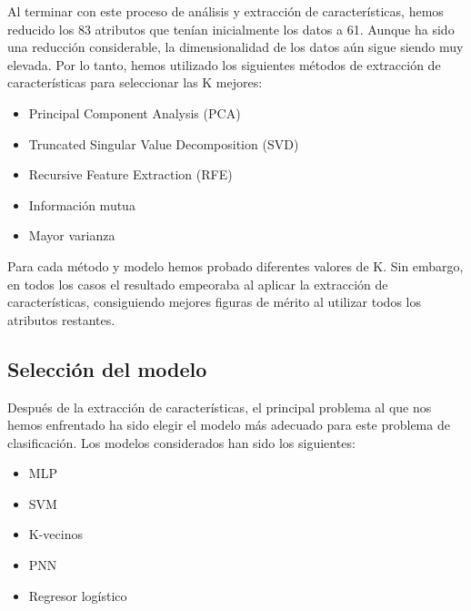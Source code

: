\documentclass[journal,twoside]{JoPhA}
\begin{document}
Al terminar con este proceso de análisis y extracción de características, hemos reducido los 83 atributos que tenían inicialmente los datos a 61. Aunque ha sido una reducción considerable, la dimensionalidad de los datos aún sigue siendo muy elevada. Por lo tanto, hemos utilizado los siguientes métodos de extracción de características para seleccionar las K mejores: \\

\begin{itemize}
	\item Principal Component Analysis (PCA)
	\item Truncated Singular Value Decomposition (SVD)
	\item Recursive Feature Extraction (RFE)
	\item Información mutua
	\item Mayor varianza \\
\end{itemize}

Para cada método y modelo hemos probado diferentes valores de K. Sin embargo, en todos los casos el resultado empeoraba al aplicar la extracción de características, consiguiendo mejores figuras de mérito al utilizar todos los atributos restantes. \\

\subsection{Selección del modelo}
Después de la extracción de características, el principal problema al que nos hemos enfrentado ha sido elegir el modelo más adecuado para este problema de clasificación. Los modelos considerados han sido los siguientes: \\

\begin{itemize}
	\item MLP
	\item SVM
	\item K-vecinos
	\item PNN
	\item Regresor logístico \\
\end{itemize} 
\end{document}
